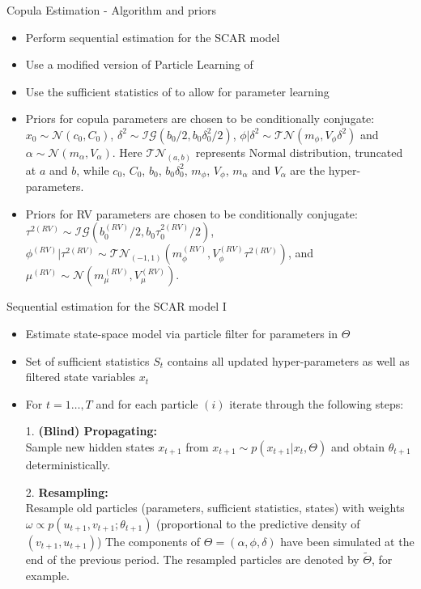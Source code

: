 \documentclass[9pt,xcolor=x11names,compress]{beamer}
\let\oldcite=\cite
\renewcommand{\cite}[1]{\textcolor{dblue}{\oldcite{#1}}}
\begin{document}
\begin{frame}{Copula Estimation - Algorithm and priors}
	\begin{itemize}
		\item Perform sequential estimation for the SCAR model
		\item Use a modified version of Particle Learning of \cite{Carvalho2010}
		\item Use the sufficient statistics of \cite{Storvik2002} to allow for parameter learning
		\item Priors for copula parameters are chosen to be conditionally conjugate: $x_0\sim \mathcal{N}(c_0,C_0)$, 
		$\delta^2 \sim \mathcal{IG} (b_0/{2},b_0\delta_0^2/{2})$, 
		$\phi|\delta^2 \sim \mathcal{TN}(m_{\phi},V_{\phi}\delta^2)$ and  
		$\alpha\sim \mathcal{N}(m_{\alpha},V_{\alpha})$. 
		Here $\mathcal{TN}_{(a,b)}$
		represents Normal distribution, truncated at $a$ and $b$, while $c_0$, $C_0$,  $b_0$,
		$b_0\delta_0^2$, $m_{\phi}$, $V_{\phi}$, $m_{\alpha}$ and $V_{\alpha}$ are the hyper-parameters. 
		\item Priors for RV parameters are chosen to be conditionally conjugate: $\tau^{2(RV)}\sim \mathcal{IG} (b^{(RV)}_0/{2},b_0\tau_0^{2(RV)}/{2})$, $\phi^{(RV)}|\tau^{2(RV)} \sim \mathcal{TN}_{(-1,1)}(m^{(RV)}_{\phi},V^{(RV)}_{\phi}\tau^{2(RV)})$, and $
		\mu^{(RV)} \sim \mathcal{N}(m^{(RV)}_{\mu},V^{(RV)}_{\mu})$.
	\end{itemize}
\end{frame}

\begin{frame}{Sequential estimation for the SCAR model I}
	\begin{itemize}
		\item Estimate state-space model via particle filter for parameters in $\Theta$
		\item Set of sufficient statistics $S_t$ contains all updated hyper-parameters as well as filtered state variables $x_t$
		\item For $t=1\ldots,T$ and for each particle $(i)$  iterate through the following steps:
	\end{itemize} 
\begin{itemize}
	\item[1.]\textbf{(Blind) Propagating:}\\ Sample new  hidden states $x_{t+1}$ from $x_{t+1}\sim p(x_{t+1}|x_t,\Theta)
	$ and obtain $\theta_{t+1}$ deterministically.
	\item[2.]\textbf{Resampling:}\\ Resample old particles (parameters, sufficient statistics, states) with weights $
	\omega\propto p(u_{t+1},v_{t+1};\theta_{t+1})$ (proportional to the predictive density of $(v_{t+1},u_{t+1})$)
	The components of $\Theta=(\alpha,\phi,\delta)$ have been simulated at the end of the previous period. The resampled particles are denoted by $\tilde{\Theta}$, for example.
\end{itemize}  
\end{frame}
\end{document}
